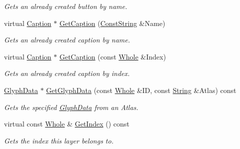 \begin{DoxyCompactItemize}
\begin{DoxyCompactList}\small\item\em Gets an already created button by name. \item\end{DoxyCompactList}\item 
virtual \hyperlink{classMezzanine_1_1UI_1_1Caption}{Caption} $\ast$ \hyperlink{classMezzanine_1_1UI_1_1Layer_ad862a32c94f66dbc749575bb103fc0db}{GetCaption} (\hyperlink{namespaceMezzanine_a63cd699ac54b73953f35ec9cfc05e506}{ConstString} \&Name)
\begin{DoxyCompactList}\small\item\em Gets an already created caption by name. \item\end{DoxyCompactList}\item 
virtual \hyperlink{classMezzanine_1_1UI_1_1Caption}{Caption} $\ast$ \hyperlink{classMezzanine_1_1UI_1_1Layer_a0e85f5557ad863eefa81dd42ca9eb45d}{GetCaption} (const \hyperlink{namespaceMezzanine_adcbb6ce6d1eb4379d109e51171e2e493}{Whole} \&Index)
\begin{DoxyCompactList}\small\item\em Gets an already created caption by index. \item\end{DoxyCompactList}\item 
\hyperlink{classMezzanine_1_1UI_1_1GlyphData}{GlyphData} $\ast$ \hyperlink{classMezzanine_1_1UI_1_1Layer_a5e4723a72e15610caae3f5b130241e19}{GetGlyphData} (const \hyperlink{namespaceMezzanine_adcbb6ce6d1eb4379d109e51171e2e493}{Whole} \&ID, const \hyperlink{namespaceMezzanine_acf9fcc130e6ebf08e3d8491aebcf1c86}{String} \&Atlas) const 
\begin{DoxyCompactList}\small\item\em Gets the specified \hyperlink{classMezzanine_1_1UI_1_1GlyphData}{GlyphData} from an Atlas. \item\end{DoxyCompactList}\item 
virtual const \hyperlink{namespaceMezzanine_adcbb6ce6d1eb4379d109e51171e2e493}{Whole} \& \hyperlink{classMezzanine_1_1UI_1_1Layer_af846031d546a465166eb6b83744c6c58}{GetIndex} () const 
\begin{DoxyCompactList}\small\item\em Gets the index this layer belongs to. \item\end{DoxyCompactList}\item 

\end{DoxyCompactItemize}
